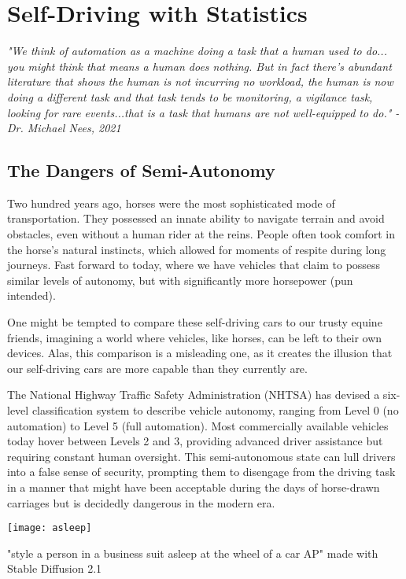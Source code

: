 \setchapterpreamble[u]{\margintoc}
\chapter{Self-Driving with Statistics}

\textit{"We think of automation as a machine doing a task that a human used to do... you might think that means a human does nothing. But in fact there's abundant literature that shows the human is not incurring no workload, the human is now doing a different task and that task tends to be monitoring, a vigilance task, looking for rare events...that is a task that humans are not well-equipped to do." - Dr. Michael Nees, 2021} \cite{nees2021}


\section{The Dangers of Semi-Autonomy}

Two hundred years ago, horses were the most sophisticated mode of transportation. They possessed an innate ability to navigate terrain and avoid obstacles, even without a human rider at the reins. People often took comfort in the horse's natural instincts, which allowed for moments of respite during long journeys. Fast forward to today, where we have vehicles that claim to possess similar levels of autonomy, but with significantly more horsepower (pun intended).

One might be tempted to compare these self-driving cars to our trusty equine friends, imagining a world where vehicles, like horses, can be left to their own devices. Alas, this comparison is a misleading one, as it creates the illusion that our self-driving cars are more capable than they currently are.

The National Highway Traffic Safety Administration (NHTSA) has devised a six-level classification system to describe vehicle autonomy, ranging from Level 0 (no automation) to Level 5 (full automation). Most commercially available vehicles today hover between Levels 2 and 3, providing advanced driver assistance but requiring constant human oversight. This semi-autonomous state can lull drivers into a false sense of security, prompting them to disengage from the driving task in a manner that might have been acceptable during the days of horse-drawn carriages but is decidedly dangerous in the modern era.

\begin{marginfigure}[-5.5cm]
        \texttt{[image: asleep]}
        \caption{"style a person in a business suit asleep at the wheel of a car AP" made with Stable Diffusion 2.1}
\end{marginfigure}

